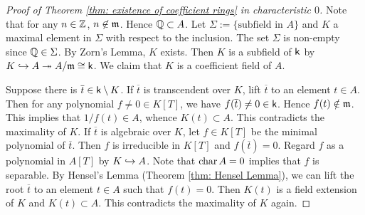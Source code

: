             



        \begin{proof}[Proof of Theorem \ref{thm: existence of coefficient rings} in characteristic \(0\)]
            Note that for any \(n \in {\mathbb{Z}}\), \(n \not\in {\mathfrak{m}}\).
            Hence \({\mathbb{Q}} \subset A\).
            Let \( \Sigma := \{ \text{subfield in } A \} \) and \(K\) a maximal element in \(\Sigma\) with respect to the inclusion.
            The set \(\Sigma\) is non-empty since \({\mathbb{Q}} \in \Sigma\). 
            By Zorn's Lemma, \(K\) exists.
            Then \(K\) is a subfield of \({\mathsf{k}}\) by \(K \hookrightarrow A \twoheadrightarrow A/{\mathfrak{m}} \cong {\mathsf{k}}\).
            We claim that \(K\) is a coefficient field of \(A\).

            Suppose there is \(\overline{t} \in {\mathsf{k}} \setminus K\). 
            If \(\overline{t}\) is transcendent over \(K\), lift \(\overline{t}\) to an element \(t \in A\).
            Then for any polynomial \(f \neq 0\in K[T]\), we have \(f(\overline{t}) \neq 0 \in {\mathsf{k}}\).
            Hence \(f(t) \notin {\mathfrak{m}}\).
            This implies that \(1/f(t) \in A\), whence \(K(t) \subset A\).
            This contradicts the maximality of \(K\).
            If \(\overline{t}\) is algebraic over \(K\), let \(f \in K[T]\) be the minimal polynomial of \(\overline{t}\).
            Then \(f\) is irreducible in \(K[T]\) and \(f(\overline{t}) = 0\).
            Regard \(f\) as a polynomial in \(A[T]\) by \(K \hookrightarrow A\).
            Note that \(\operatorname{char} A = 0\) implies that \(f\) is separable.
            By Hensel's Lemma (Theorem \ref{thm: Hensel Lemma}), we can lift the root \(\overline{t}\) to an element \(t \in A\) such that \(f(t) = 0\).
            Then \(K(t)\) is a field extension of \(K\) and \(K(t) \subset A\).
            This contradicts the maximality of \(K\) again.
        \end{proof}

